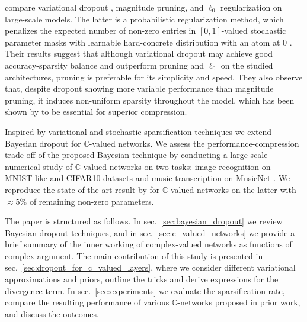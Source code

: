 \documentclass[a4paper,10pt]{article}
\newcommand{\cplx}{\mathbb{C}}
\begin{document}
\citet{gale_state_2019} compare variational dropout \citep{kingma_variational_2015},
magnitude pruning, and $\ell_0$ regularization \citep{louizos_learning_2017} on large-scale
models. The latter is a probabilistic regularization method, which penalizes the expected
number of non-zero entries in $[0, 1]$-valued stochastic parameter masks with learnable
hard-concrete distribution with an atom at $0$ \citep{maddison_concrete_2016,jang_categorical_2017}.
Their results suggest that although variational dropout may achieve good accuracy-sparsity balance
and outperform pruning and $\ell_0$ on the studied architectures, pruning is preferable for
its simplicity and speed. They also observe that, despite dropout showing more variable
performance than magnitude pruning, it induces non-uniform sparsity throughout the model,
which has been shown by \citet{he_amc:_2018} to be essential for superior compression.
%
%

Inspired by variational and stochastic sparsification techniques we extend Bayesian dropout
for $\cplx$-valued networks. We assess the performance-compression trade-off of the proposed
Bayesian technique by conducting a large-scale numerical study of $\cplx$-valued networks
on two tasks: image recognition on MNIST-like and CIFAR10 datasets and music transcription
on MusicNet \citep{thickstun_learning_2017}. We reproduce the state-of-the-art result by
\citet{trabelsi_deep_2017} for $\cplx$-valued networks on the latter with $\approx 5\%$
of remaining non-zero parameters.

The paper is structured as follows. In sec.~\ref{sec:bayesian_dropout} we review Bayesian
dropout techniques, and in sec.~\ref{sec:c_valued_networks} we provide a brief summary of
the inner working of complex-valued networks as functions of complex argument. The main
contribution of this study is presented in sec.~\ref{sec:dropout_for_c_valued_layers},
where we consider different variational approximations and priors, outline the tricks
and derive expressions for the divergence term. In sec.~\ref{sec:experiments} we evaluate
the sparsification rate, compare the resulting performance of various $\cplx$-networks
proposed in prior work, and discuss the outcomes.
\end{document}
